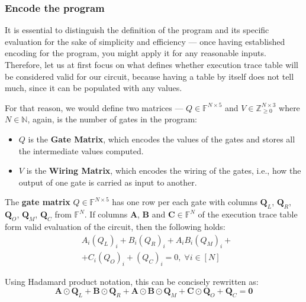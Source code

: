 \documentclass[../lecture-notes.tex]{subfiles}
\begin{document}
\subsubsection{Encode the program}

It is essential to distinguish the definition of the program and its specific
evaluation for the sake of simplicity and efficiency --- once having established
encoding for the program, you might apply it for any reasonable inputs.
Therefore, let us at first focus on what defines whether execution trace table
will be considered valid for our circuit, because having a table by itself does
not tell much, since it can be populated with any values. 

For that reason, we would define two matrices --- $Q \in \mathbb{F}^{N \times
5}$ and $V \in \mathbb{Z}_{\geq 0}^{N \times 3}$ where $N \in \mathbb{N}$, again, is the number of gates in the
program:
\begin{itemize}
    \item $Q$ is the \textbf{Gate Matrix}, which encodes the values of the gates and stores all the intermediate values computed.
    \item $V$ is the \textbf{Wiring Matrix}, which encodes the wiring of the gates, i.e., how the output of one gate is carried as input to another.
\end{itemize}

\begin{definition}
The \textbf{gate matrix} $Q \in \mathbb{F}^{N \times 5}$ has one row per each gate with columns $\mathbf{Q}_L$,
$\mathbf{Q}_R$, $\mathbf{Q}_O$, $\mathbf{Q}_M$, $\mathbf{Q}_C$ from
$\mathbb{F}^N$. If columns $\mathbf{A}$, $\mathbf{B}$ and $\mathbf{C} \in
\mathbb{F}^N$ of the execution trace table form valid evaluation of the circuit, 
then the following holds:
\begin{equation*}
    \begin{aligned}
        &A_i (Q_{L})_i + B_i (Q_{R})_i + A_i B_i (Q_{M})_i + \\
        &+ C_i (Q_{O})_i + (Q_{C})_i = 0, \; \forall i \in [N]            
    \end{aligned}
\end{equation*}

Using Hadamard product notation, this can be concisely rewritten as:
\begin{equation*}
    \mathbf{A} \odot \mathbf{Q}_L + \mathbf{B} \odot \mathbf{Q}_R + \mathbf{A} \odot \mathbf{B} \odot \mathbf{Q}_M + \mathbf{C} \odot \mathbf{Q}_O + \mathbf{Q}_C = \mathbf{0}
\end{equation*}

\end{definition}
\end{document}
